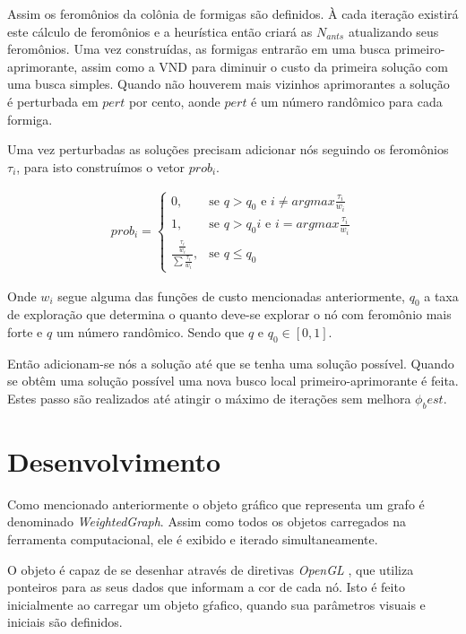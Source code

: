\documentclass[conference,compsoc]{IEEEtran}
\begin{document}
Assim os feromônios da colônia de formigas são definidos. À cada iteração existirá este cálculo de feromônios e a heurística então criará as $N_{ants}$ atualizando seus feromônios. Uma vez construídas, as formigas entrarão em uma busca primeiro-aprimorante, assim como a VND para diminuir o custo da primeira solução com uma busca simples. Quando não houverem mais vizinhos aprimorantes a solução é perturbada em $pert$ por cento, aonde $pert$ é um número randômico para cada formiga.

Uma vez perturbadas as soluções precisam adicionar nós seguindo os feromônios $\tau_i$, para isto construímos o vetor $prob_i$.

\begin{eqnarray*}
    prob_i =  \begin{cases} 
                0, & \mbox{se } q > q_0  \mbox{ e } i \neq argmax \frac{\tau_i}{w_i}\\ 
                1, & \mbox{se } q > q_0 i \mbox{ e } i = argmax \frac{\tau_i}{w_i}\\ 
                \frac{\frac{\tau_i}{w_i}}{\sum\frac{\tau_i}{w_i}}, & \mbox{se } q \leq q_0
                \end{cases}
    \label{03_ants}
\end{eqnarray*}

Onde $w_i$ segue alguma das funções de custo mencionadas anteriormente, $q_0$ a taxa de exploração que determina o quanto deve-se explorar o nó com feromônio mais forte e $q$ um número randômico. Sendo que $q$ e $q_0 \in [0,1]$.

Então adicionam-se nós a solução até que se tenha uma solução possível. Quando se obtêm uma solução possível uma nova busco local primeiro-aprimorante é feita. Estes passo são realizados até atingir o máximo de iterações sem melhora $\phi_best$.


\section{Desenvolvimento}

Como mencionado anteriormente o objeto gráfico que representa um grafo é denominado \textit{WeightedGraph}. Assim como todos os objetos carregados na ferramenta computacional, ele é exibido e iterado simultaneamente.

O objeto é capaz de se desenhar através de diretivas \textit{OpenGL} \cite{OpenGL}, que utiliza ponteiros para as seus dados que informam a cor de cada nó. Isto é feito inicialmente ao carregar um objeto gŕafico, quando sua parâmetros visuais e iniciais são definidos.
\end{document}
